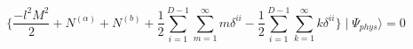 \begin{equation}
\{\frac{-l^{2}M^{2}}{2}+N^{(\alpha)}+N^{(b)}+
\frac{1}{2}\sum_{i=1}^{D-1}\sum_{m=1}^{\infty}m\delta^{ii}-
\frac{1}{2}\sum_{i=1}^{D-1}\sum_{k=1}^{\infty}k\delta^{ii}
\}\mid\Psi_{phys}\rangle = 0
\end{equation}


